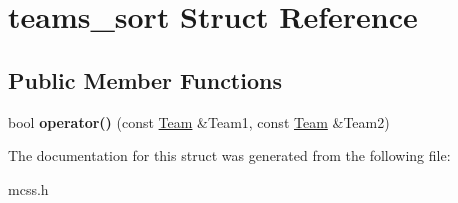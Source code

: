 \hypertarget{structteams__sort}{}\section{teams\+\_\+sort Struct Reference}
\label{structteams__sort}
\subsection*{Public Member Functions}
\begin{DoxyCompactItemize}
\item 
bool {\bfseries operator()} (const \hyperlink{classTeam}{Team} \&Team1, const \hyperlink{classTeam}{Team} \&Team2)\hypertarget{structteams__sort_a68d2fec61e9382bf0fb41f6483d34354}{}\label{structteams__sort_a68d2fec61e9382bf0fb41f6483d34354}

\end{DoxyCompactItemize}


The documentation for this struct was generated from the following file\+:\begin{DoxyCompactItemize}
\item 
mcss.\+h\end{DoxyCompactItemize}
